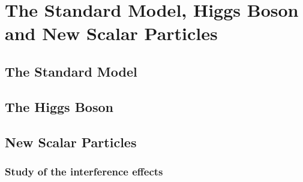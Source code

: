 \chapter{The Standard Model, Higgs Boson and New Scalar Particles }

\section{The Standard Model}

\section{The Higgs Boson}

\section{New Scalar Particles}

\subsection{Study of the interference effects}
